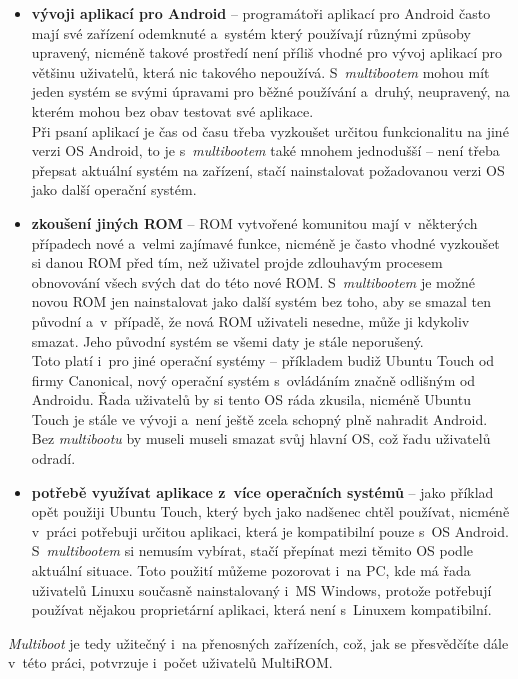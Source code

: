 \documentclass[12pt, a4paper, oneside]{article}
\newcommand{\B}{\textbf} %
\newcommand{\It}{\textit}  %
\begin{document}
\begin{itemize}
    \item \B{vývoji aplikací pro Android} -- programátoři aplikací pro Android často mají své zařízení odemknuté a~systém který používají různými způsoby upravený, nicméně takové prostředí není příliš vhodné pro vývoj aplikací pro většinu uživatelů, která nic takového nepoužívá. S~\It{multibootem} mohou mít jeden systém se svými úpravami pro běžné používání a~druhý, neupravený, na kterém mohou bez obav testovat své aplikace. \\
    Při psaní aplikací je čas od času třeba vyzkoušet určitou funkcionalitu na jiné verzi OS Android, to je s~\It{multibootem} také mnohem jednodušší -- není třeba přepsat aktuální systém na zařízení, stačí nainstalovat požadovanou verzi OS jako další operační systém.

    \item \B{zkoušení jiných ROM} -- ROM vytvořené komunitou mají v~některých případech nové a~velmi zajímavé funkce, nicméně je často vhodné vyzkoušet si danou ROM před tím, než uživatel projde zdlouhavým procesem obnovování všech svých dat do této nové ROM. S~\It{multibootem} je možné novou ROM jen nainstalovat jako další systém bez toho, aby se smazal ten původní a~v~případě, že nová ROM uživateli nesedne, může ji kdykoliv smazat. Jeho původní systém se všemi daty je stále neporušený.\\
    Toto platí i~pro jiné operační systémy -- příkladem budiž Ubuntu Touch od firmy Canonical, nový operační systém s~ovládáním značně odlišným od Androidu. Řada uživatelů by si tento OS ráda zkusila, nicméně Ubuntu Touch je stále ve vývoji a~není ještě zcela schopný plně nahradit Android. Bez \It{multibootu} by museli museli smazat svůj hlavní OS, což řadu uživatelů odradí.

    \item \B{potřebě využívat aplikace z~více operačních systémů} -- jako příklad opět použiji Ubuntu Touch, který bych jako nadšenec chtěl používat, nicméně v~práci potřebuji určitou aplikaci, která je kompatibilní pouze s~OS Android. S~\It{multibootem} si nemusím vybírat, stačí přepínat mezi těmito OS podle aktuální situace. Toto použití můžeme pozorovat i~na PC, kde má řada uživatelů Linuxu současně nainstalovaný i~MS Windows, protože potřebují používat nějakou proprietární aplikaci, která není s~Linuxem kompatibilní.
\end{itemize}

\noindent \It{Multiboot} je tedy užitečný i~na přenosných zařízeních, což, jak se přesvědčíte dále v~této práci, potvrzuje i~počet uživatelů MultiROM.
\end{document}
